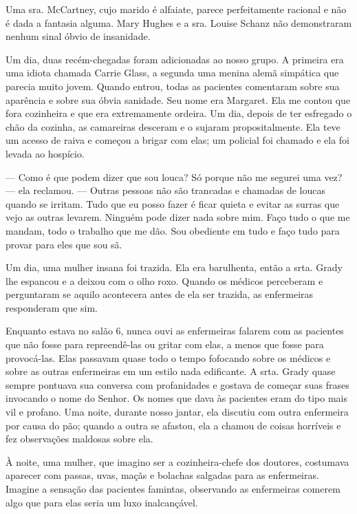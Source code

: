 Uma sra. McCartney, cujo marido é alfaiate, parece perfeitamente
racional e não é dada a fantasia alguma. Mary Hughes e a sra. Louise
Schanz não demonstraram nenhum sinal óbvio de insanidade.

Um dia, duas recém-chegadas foram adicionadas ao nosso grupo. A primeira
era uma idiota chamada Carrie Glass, a segunda uma menina alemã
simpática que parecia muito jovem. Quando entrou, todas as pacientes
comentaram sobre sua aparência e sobre sua óbvia sanidade. Seu nome era
Margaret. Ela me contou que fora cozinheira e que era extremamente
ordeira. Um dia, depois de ter esfregado o chão da cozinha, as
camareiras desceram e o sujaram propositalmente. Ela teve um acesso de
raiva e começou a brigar com elas; um policial foi chamado e ela foi
levada ao hospício.

--- Como é que podem dizer que sou louca? Só porque não me segurei uma
vez? --- ela reclamou. --- Outras pessoas não são trancadas e chamadas
de loucas quando se irritam. Tudo que eu posso fazer é ficar quieta e
evitar as surras que vejo as outras levarem. Ninguém pode dizer nada
sobre mim. Faço tudo o que me mandam, todo o trabalho que me dão. Sou
obediente em tudo e faço tudo para provar para eles que sou sã.

Um dia, uma mulher insana foi trazida. Ela era barulhenta, então a srta.
Grady lhe espancou e a deixou com o olho roxo. Quando os médicos
perceberam e perguntaram se aquilo acontecera antes de ela ser trazida, as
enfermeiras responderam que sim.

Enquanto estava no salão 6, nunca ouvi as enfermeiras falarem com as
pacientes que não fosse para repreendê-las ou gritar com elas, a menos
que fosse para provocá-las. Elas passavam quase todo o tempo fofocando
sobre os médicos e sobre as outras enfermeiras em um estilo nada
edificante. A srta. Grady quase sempre pontuava sua conversa com
profanidades e gostava de começar suas frases invocando o nome do
Senhor. Os nomes que dava às pacientes eram do tipo mais vil e profano.
Uma noite, durante nosso jantar, ela discutiu com outra enfermeira por
causa do pão; quando a outra se afastou, ela a chamou de coisas
horríveis e fez observações maldosas sobre ela.

À noite, uma mulher, que imagino ser a cozinheira-chefe dos
doutores, costumava aparecer com passas, uvas, maçãs e bolachas salgadas
para as enfermeiras. Imagine a sensação das pacientes famintas,
observando as enfermeiras comerem algo que para elas seria um luxo
inalcançável.

